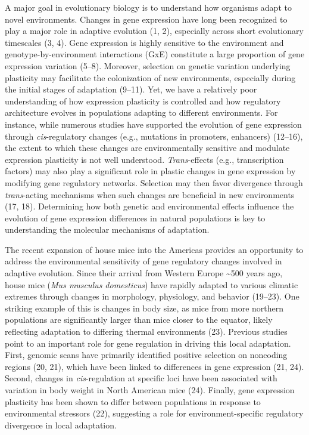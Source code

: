 \documentclass[9pt,twocolumn,twoside,lineno]{pnas-new}
\begin{document}
A major goal in evolutionary biology is to understand how organisms
adapt to novel environments. Changes in gene expression have long been
recognized to play a major role in adaptive evolution (1, 2), especially
across short evolutionary timescales (3, 4). Gene expression is highly
sensitive to the environment and genotype-by-environment interactions
(GxE) constitute a large proportion of gene expression variation (5--8).
Moreover, selection on genetic variation underlying plasticity may
facilitate the colonization of new environments, especially during the
initial stages of adaptation (9--11). Yet, we have a relatively poor
understanding of how expression plasticity is controlled and how
regulatory architecture evolves in populations adapting to different
environments. For instance, while numerous studies have supported the
evolution of gene expression through \emph{cis}-regulatory changes
(e.g., mutations in promoters, enhancers) (12--16), the extent to which
these changes are environmentally sensitive and modulate expression
plasticity is not well understood. \emph{Trans}-effects (e.g.,
transcription factors) may also play a significant role in plastic
changes in gene expression by modifying gene regulatory networks.
Selection may then favor divergence through \emph{trans}-acting
mechanisms when such changes are beneficial in new environments (17,
18). Determining how both genetic and environmental effects influence
the evolution of gene expression differences in natural populations is
key to understanding the molecular mechanisms of adaptation.

The recent expansion of house mice into the Americas provides an
opportunity to address the environmental sensitivity of gene regulatory
changes involved in adaptive evolution. Since their arrival from Western
Europe \textasciitilde500 years ago, house mice (\emph{Mus musculus
domesticus}) have rapidly adapted to various climatic extremes through
changes in morphology, physiology, and behavior (19--23). One striking
example of this is changes in body size, as mice from more northern
populations are significantly larger than mice closer to the equator,
likely reflecting adaptation to differing thermal environments (23).
Previous studies point to an important role for gene regulation in
driving this local adaptation. First, genomic scans have primarily
identified positive selection on noncoding regions (20, 21), which have
been linked to differences in gene expression (21, 24). Second, changes
in \emph{cis}-regulation at specific loci have been associated with
variation in body weight in North American mice (24). Finally, gene
expression plasticity has been shown to differ between populations in
response to environmental stressors (22), suggesting a role for
environment-specific regulatory divergence in local adaptation.
\end{document}
